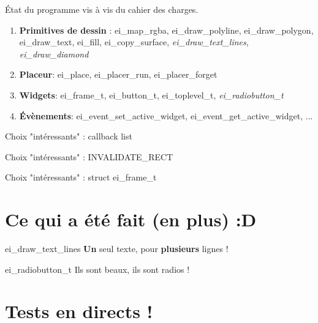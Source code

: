 \documentclass[10pt]{beamer}
\begin{document}
\begin{frame}{État du programme vis à vis du cahier des charges.}

    \begin{enumerate}
        \item \textbf{Primitives de dessin} : ei\_map\_rgba, ei\_draw\_polyline, ei\_draw\_polygon, ei\_draw\_text, ei\_fill, ei\_copy\_surface, \emph{ei\_draw\_text\_lines}, \emph{ei\_draw\_diamond}
        \item \textbf{Placeur}: ei\_place, ei\_placer\_run, ei\_placer\_forget
        \item \textbf{Widgets}: ei\_frame\_t, ei\_button\_t, ei\_toplevel\_t, \emph{ei\_radiobutton\_t}
        \item \textbf{Évènements}: ei\_event\_set\_active\_widget, ei\_event\_get\_active\_widget, ...
    \end{enumerate}

\end{frame}
\lstset{
basicstyle=\footnotesize, frame=tb,
xleftmargin=.2\textwidth, xrightmargin=.2\textwidth
}
\begin{frame}{Choix "intéressants" : callback list}

\end{frame}

\begin{frame}{Choix "intéressants" : INVALIDATE\_RECT}

\end{frame}

\begin{frame}{Choix "intéressants" : struct ei\_frame\_t}
    \begin{center}
        
    \end{center}
\end{frame}

\section{Ce qui a été fait (en plus) :D}

\begin{frame}{ei\_draw\_text\_lines}
    \textbf{Un} seul texte, pour \textbf{plusieurs} lignes !
\end{frame}


\begin{frame}{ei\_radiobutton\_t}
    Ils sont beaux, ils sont radios !
\end{frame}

\section{Tests en directs !}

\end{document}
